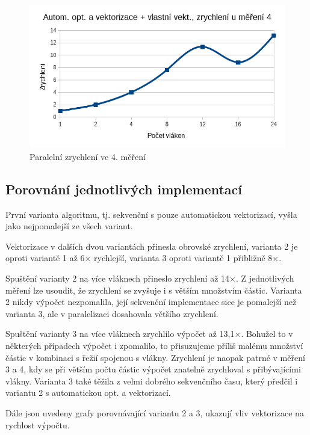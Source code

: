 \documentclass[12pt]{article}
\begin{document}
\begin{figure}[H]
  \begin{center}
     \includegraphics[width=12cm]{images/ssef4acc.png}
    \caption{Paralelní zrychlení ve 4. měření} 
  \end{center}
\end{figure}

\subsection{Porovnání jednotlivých implementací}
První varianta algoritmu, tj. sekvenční s pouze automatickou vektorizací, vyšla jako nejpomalejší ze všech variant.

Vektorizace v dalších dvou variantách přinesla obrovské zrychlení, varianta 2 je oproti variantě 1 až 6${\times}$ rychlejší, varianta 3 oproti variantě 1 přibližně 8${\times}$.

Spuštění varianty 2 na více vláknech přineslo zrychlení až 14${\times}$. Z jednotlivých měření lze usoudit, že zrychlení se zvyšuje i s větším množstvím částic.
Varianta 2 nikdy výpočet nezpomalila, její sekvenční implementace sice je pomalejší než varianta 3, ale v paralelizaci dosahovala většího zrychlení.

Spuštění varianty 3 na více vláknech zrychlilo výpočet až 13,1${\times}$.
Bohužel to v některých případech výpočet i zpomalilo, to přisuzujeme příliš malému množství částic v kombinaci s řežií spojenou s vlákny.
Zrychlení je naopak patrné v měření 3 a 4, kdy se při větším počtu částic výpočet znatelně zrychloval s přibývajícími vlákny.
Varianta 3 také těžila z velmi dobrého sekvenčního času, který předčil i variantu 2 s automatickou opt. a vektorizací.

Dále jsou uvedeny grafy porovnávající variantu 2 a 3, ukazují vliv vektorizace na rychlost výpočtu.
\end{document}
